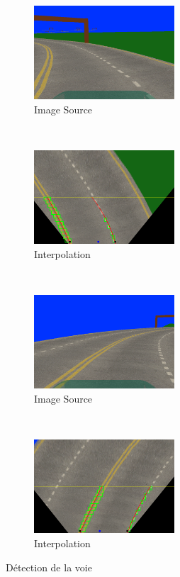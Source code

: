 \documentclass[12pt, openany]{report}
\begin{document}
\begin{figure}[H]
     \centering
     \begin{subfigure}[b]{0.4\textwidth}
         \centering
         \includegraphics[width=\textwidth, height = 3.5cm]{3.png}
         \caption{Image Source}
     \end{subfigure}
     ~
     \begin{subfigure}[b]{0.4\textwidth}
         \centering
         \includegraphics[width=\textwidth, height = 3.5cm]{fs.png}
         \caption{Interpolation}
     \end{subfigure}
     \\
     \begin{subfigure}[b]{0.4\textwidth}
         \centering
         \includegraphics[width=\textwidth, height = 3.5cm]{5.png}
         \caption{Image Source}
     \end{subfigure}
     ~
     \begin{subfigure}[b]{0.4\textwidth}
         \centering
         \includegraphics[width=\textwidth, height = 3.5cm]{fs2.png}
         \caption{Interpolation}
     \end{subfigure}
     \caption{Détection de la voie}
     \label{fig:detect}     
\end{figure}
\end{document}
